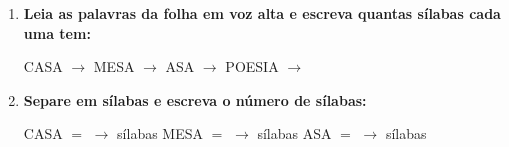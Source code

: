 \begin{exercicio}
\begin{enumerate}[resume]
  \item \textbf{Leia as palavras da folha em voz alta e escreva quantas sílabas cada uma tem:}

  \begin{center}
  CASA $\rightarrow$ \underline{\hspace{1cm}} \quad MESA $\rightarrow$ \underline{\hspace{1cm}} \quad ASA $\rightarrow$ \underline{\hspace{1cm}} \quad POESIA $\rightarrow$ \underline{\hspace{1cm}}
  \end{center}

  \item \textbf{Separe em sílabas e escreva o número de sílabas:}
  \begin{center}
  CASA $=$ \underline{\hspace{1.2cm}} $\rightarrow$ \underline{\hspace{0.8cm}} sílabas \quad MESA $=$ \underline{\hspace{1.2cm}} $\rightarrow$ \underline{\hspace{0.8cm}} sílabas \quad ASA $=$ \underline{\hspace{1.2cm}} $\rightarrow$ \underline{\hspace{0.8cm}} sílabas
  \end{center}

\end{enumerate}

\end{exercicio}



